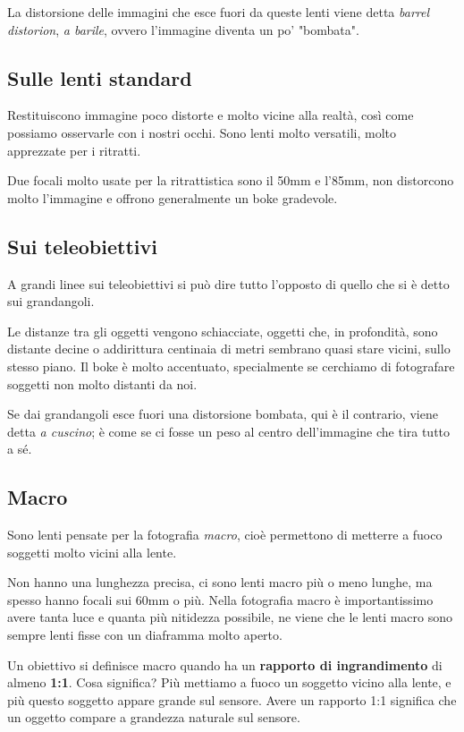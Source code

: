 La distorsione delle immagini che esce fuori da queste lenti viene detta \textit{barrel distorion}, \textit{a barile}, ovvero l'immagine diventa un po' "bombata".


\subsection{Sulle lenti standard} \label{subsec:sullestandard}
Restituiscono immagine poco distorte e molto vicine alla realtà, così come possiamo osservarle con i nostri occhi. Sono lenti molto versatili, molto apprezzate per i ritratti.

Due focali molto usate per la ritrattistica sono il 50mm e l'85mm, non distorcono molto l'immagine e offrono generalmente un boke gradevole.


\subsection{Sui teleobiettivi} \label{subsec:suitele}
A grandi linee sui teleobiettivi si può dire tutto l'opposto di quello che si è detto sui grandangoli.

Le distanze tra gli oggetti vengono schiacciate, oggetti che, in profondità, sono distante decine o addirittura centinaia di metri sembrano quasi stare vicini, sullo stesso piano.\newline
Il boke è molto accentuato, specialmente se cerchiamo di fotografare soggetti non molto distanti da noi.

Se dai grandangoli esce fuori una distorsione bombata, qui è il contrario, viene detta \textit{a cuscino}; è come se ci fosse un peso al centro dell'immagine che tira tutto a sé.


\subsection{Macro} \label{subsec:lentimacro}
Sono lenti pensate per la fotografia \textit{macro}, cioè permettono di metterre a fuoco soggetti molto vicini alla lente.

Non hanno una lunghezza precisa, ci sono lenti macro più o meno lunghe, ma spesso hanno focali sui 60mm o più.\newline
Nella fotografia macro è importantissimo avere tanta luce e quanta più nitidezza possibile, ne viene che le lenti macro sono sempre lenti fisse con un diaframma molto aperto.

Un obiettivo si definisce macro quando ha un \textbf{rapporto di ingrandimento} di almeno \textbf{1:1}. Cosa significa?
Più mettiamo a fuoco un soggetto vicino alla lente, e più questo soggetto appare grande sul sensore. Avere un rapporto 1:1 significa che un oggetto compare a grandezza naturale sul sensore.


